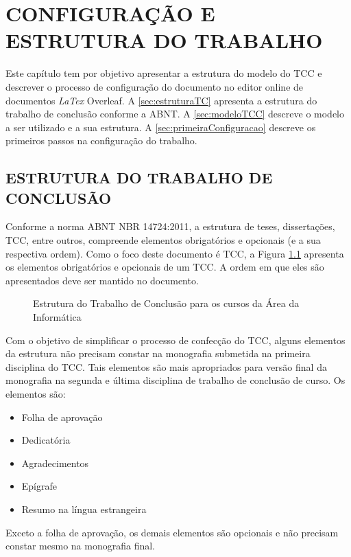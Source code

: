 \chapter{CONFIGURAÇÃO E ESTRUTURA DO TRABALHO}
\label{cap:configuracao}

Este capítulo tem por objetivo apresentar a estrutura do modelo do \ac{TCC} e descrever o processo de configuração do documento no editor online de documentos \textit{LaTex} Overleaf. A \autoref{sec:estruturaTC} apresenta a estrutura do trabalho de conclusão conforme a ABNT. A \autoref{sec:modeloTCC} descreve o modelo a ser utilizado e a sua estrutura. A \autoref{sec:primeiraConfiguracao} descreve os primeiros passos na configuração do trabalho. 

\section{ESTRUTURA DO TRABALHO DE CONCLUSÃO}
\label{sec:estruturaTC}
Conforme a norma ABNT NBR 14724:2011, a estrutura de teses, dissertações, \ac{TCC}, entre outros, compreende elementos obrigatórios e opcionais (e a sua respectiva ordem). Como o foco deste documento é \ac{TCC}, a Figura \ref{fig:estruturaTCC} apresenta os elementos obrigatórios e opcionais de um TCC. A ordem em que eles são apresentados deve ser mantido no documento. 

\begin{figure}[h]
	\caption{Estrutura do Trabalho de Conclusão para os cursos da Área da Informática}
	\centering 
	\label{fig:estruturaTCC}
\end{figure}    

Com o objetivo de simplificar o processo de confecção do \ac{TCC}, alguns elementos da estrutura não precisam constar na monografia submetida na primeira disciplina do \ac{TCC}. Tais elementos são mais apropriados para versão final da monografia na segunda e última disciplina de trabalho de conclusão de curso.  Os elementos são: 
\begin{itemize}
	\item Folha de aprovação
	\item Dedicatória
	\item Agradecimentos
	\item Epígrafe
	\item Resumo na língua estrangeira
\end{itemize}
Exceto a folha de aprovação, os demais elementos são opcionais e não precisam constar mesmo na monografia final.

